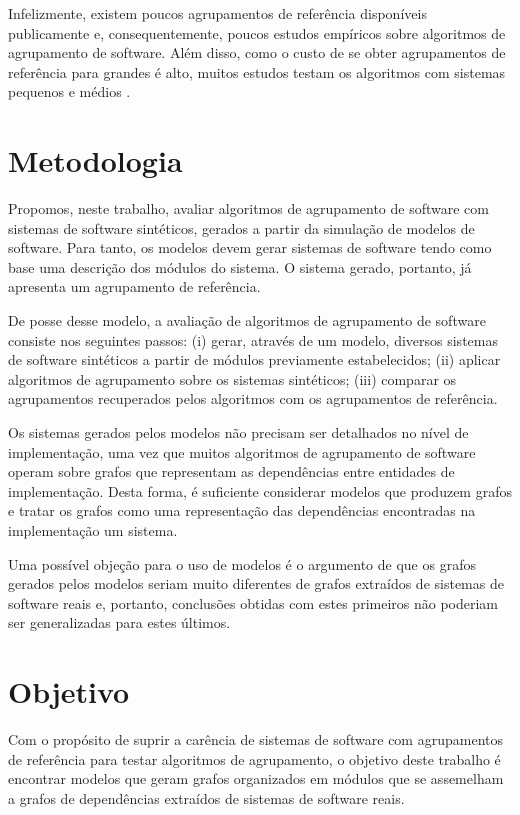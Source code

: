 Infelizmente, existem poucos agrupamentos de referência disponíveis publicamente \cite{Koschke2000} e, consequentemente, poucos estudos empíricos sobre algoritmos de agrupamento de software. Além disso, como o custo de se obter agrupamentos de referência para grandes é alto, muitos estudos testam os algoritmos com sistemas pequenos e médios \cite{Anquetil1999,Maqbool2007,Bittencourt2009}.

\section{Metodologia}

Propomos, neste trabalho, avaliar algoritmos de agrupamento de software com sistemas de software sintéticos, gerados a partir da simulação de modelos de software. Para tanto, os modelos devem gerar sistemas de software tendo como base uma descrição dos módulos do sistema. O sistema gerado, portanto, já apresenta um agrupamento de referência.

De posse desse modelo, a avaliação de algoritmos de agrupamento de software consiste nos seguintes passos: (i) gerar, através de um modelo, diversos sistemas de software sintéticos a partir de módulos previamente estabelecidos; (ii) aplicar algoritmos de agrupamento sobre os sistemas sintéticos; (iii) comparar os agrupamentos recuperados pelos algoritmos com os agrupamentos de referência.

Os sistemas gerados pelos modelos não precisam ser detalhados no nível de implementação, uma vez que muitos algoritmos de agrupamento de software operam sobre grafos que representam as dependências entre entidades de implementação. Desta forma, é suficiente considerar modelos que produzem grafos e tratar os grafos como uma representação das dependências encontradas na implementação um sistema.

Uma possível objeção para o uso de modelos é o argumento de que os grafos gerados pelos modelos seriam muito diferentes de grafos extraídos de sistemas de software reais e, portanto, conclusões obtidas com estes primeiros não poderiam ser generalizadas para estes últimos.

\section{Objetivo}

Com o propósito de suprir a carência de sistemas de software com agrupamentos de referência para testar algoritmos de agrupamento, o objetivo deste trabalho é encontrar modelos que geram grafos organizados em módulos que se assemelham a grafos de dependências extraídos de sistemas de software reais.

